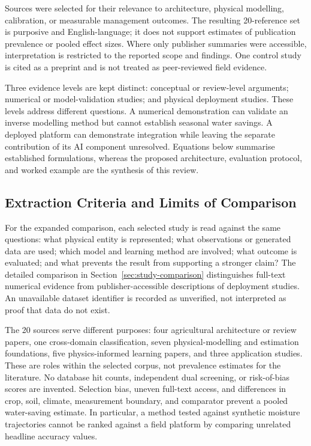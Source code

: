 \documentclass[acmsmall,screen,nonacm]{acmart}
\begin{document}
Sources were selected for their relevance to architecture, physical modelling, calibration, or measurable management outcomes. The resulting 20-reference set is purposive and English-language; it does not support estimates of publication prevalence or pooled effect sizes. Where only publisher summaries were accessible, interpretation is restricted to the reported scope and findings. One control study \cite{R18} is cited as a preprint and is not treated as peer-reviewed field evidence.

Three evidence levels are kept distinct: conceptual or review-level arguments; numerical or model-validation studies; and physical deployment studies. These levels address different questions. A numerical demonstration can validate an inverse modelling method but cannot establish seasonal water savings. A deployed platform can demonstrate integration while leaving the separate contribution of its AI component unresolved. Equations below summarise established formulations, whereas the proposed architecture, evaluation protocol, and worked example are the synthesis of this review.


\subsection{Extraction Criteria and Limits of Comparison}
\label{sec:extraction}
For the expanded comparison, each selected study is read against the same questions: what physical entity is represented; what observations or generated data are used; which model and learning method are involved; what outcome is evaluated; and what prevents the result from supporting a stronger claim? The detailed comparison in Section~\ref{sec:study-comparison} distinguishes full-text numerical evidence from publisher-accessible descriptions of deployment studies. An unavailable dataset identifier is recorded as unverified, not interpreted as proof that data do not exist.

The 20 sources serve different purposes: four agricultural architecture or review papers, one cross-domain classification, seven physical-modelling and estimation foundations, five physics-informed learning papers, and three application studies. These are roles within the selected corpus, not prevalence estimates for the literature. No database hit counts, independent dual screening, or risk-of-bias scores are invented. Selection bias, uneven full-text access, and differences in crop, soil, climate, measurement boundary, and comparator prevent a pooled water-saving estimate. In particular, a method tested against synthetic moisture trajectories cannot be ranked against a field platform by comparing unrelated headline accuracy values.
\end{document}
